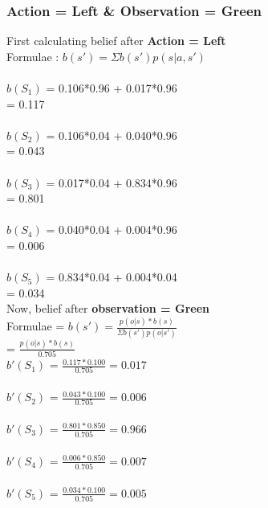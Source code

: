 \documentclass[10pt,letterpaper]{article}
\begin{document}
\subsubsection*{Action = Left \& Observation = Green}
First calculating belief after \textbf{Action = Left}\\
Formulae : $b(s') = \Sigma b(s')p(s|a,s')$\\\\
$b(S_1)$ =  0.106*0.96 + 0.017*0.96\\ \hspace*{23pt} = 0.117\\\\
$b(S_2)$ =  0.106*0.04 + 0.040*0.96\\ \hspace*{23pt} = 0.043\\\\
$b(S_3)$ =  0.017*0.04 + 0.834*0.96\\ \hspace*{23pt} = 0.801\\\\
$b(S_4)$ =  0.040*0.04 + 0.004*0.96\\ \hspace*{23pt} = 0.006\\\\
$b(S_5)$ =  0.834*0.04 + 0.004*0.04\\ \hspace*{23pt} = 0.034\\

\noindent Now, belief after \textbf{observation = Green}\\
Formulae = $b(s') = \frac{p(o|s)*b(s)}{\Sigma b(s')p(o|s')}$\\
\hspace*{74pt} = $\frac{p(o|s)*b(s)}{0.705}$\\

\noindent $b'(S_1)$ = $\frac{0.117*0.100}{0.705} = 0.017$\\\\
$b'(S_2)$ = $\frac{0.043*0.100}{0.705} = 0.006$\\\\
$b'(S_3)$ = $\frac{0.801*0.850}{0.705} = 0.966$\\\\
$b'(S_4)$ = $\frac{0.006*0.850}{0.705} = 0.007$\\\\
$b'(S_5)$ = $\frac{0.034*0.100}{0.705} = 0.005$\\\\
\end{document}
